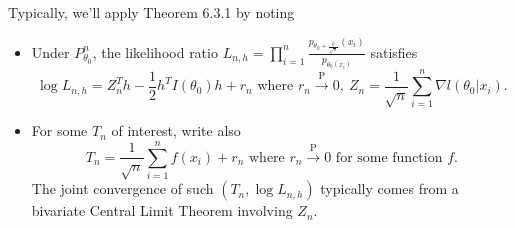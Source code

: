 \documentclass[a4paper]{article}
\begin{document}
\begin{eg}
	\begin{remark}
		Typically, we'll apply Theorem 6.3.1 by noting
		\begin{itemize}
			\item Under $P_{\theta_0}^n$, the likelihood ratio $L_{n,h} = \prod\limits_{i=1}^n \frac{p_{\theta_0+\frac{h}{\sqrt{n}}}(x_i)}{p_{\theta_0(x_i)}}$ satisfies
			\begin{equation*}
				\log L_{n,h} = Z_n^Th - \frac{1}{2} h^T I(\theta_0) h + r_n \text{ where } r_n \stackrel{\text{P}}{\longrightarrow} 0, \ Z_n = \frac{1}{\sqrt{n}} \sum\limits_{i=1}^n \nabla l(\theta_0 | x_i).
			\end{equation*}
			\item For some $T_n$ of interest, write also
			\begin{equation*}
				T_n = \frac{1}{\sqrt{n}} \sum\limits_{i=1}^n f(x_i) + r_n \text{ where } r_n \stackrel{\text{P}}{\longrightarrow} 0 \text{ for some function } f.
			\end{equation*}
			The joint convergence of such $(T_n,\log L_{n,h})$ typically comes from a bivariate Central Limit Theorem involving $Z_n$.
		\end{itemize}
	\end{remark}
\end{eg}
\end{document}
